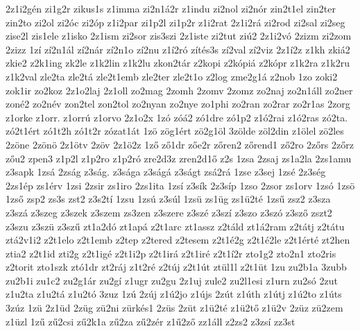 {2z1i2gén
zi1g2r
zikus1s
z1imma
zi2n1á2r
z1indu
zi2nol
zi2nór
zin2t1el
zin2ter
zin2to
zi2ol
zi2óc
zi2óp
z1i2par
zi1p2l
zi1p2r
z1i2rat
2z1i2rá
zi2rod
zi2sal
zi2seg
zise2l
zis1ele
z1isko
2z1ism
zi2sor
zis3szi
2z1iste
zi2tut
ziú2
2z1i2vó
2zizm
zi2zom
2zizz
1zí
zí2n1ál
zí2nár
zí2n1o
zí2nu
z1í2ró
zítés3s
zí2val
zí2viz
2z1í2z
z1kh
zkiá2
zkie2
z2k1ing
zk2le
z1k2lin
z1k2lu
zkon2tár
z2kopi
z2kópiá
z2kópr
z1k2ra
z1k2ru
z1k2val
zle2ta
zle2tá
zle2t1emb
zle2ter
zle2t1o
z2log
zme2g1á
z2nob
1zo
zoki2
zok1ir
zo2koz
2z1o2laj
2z1oll
zo2mag
2zomh
2zomv
2zomz
zo2naj
zo2n1áll
zo2ner
zoné2
zo2név
zon2tel
zon2tol
zo2nyan
zo2nye
zo1phi
zo2ran
zo2rar
zo2r1as
2zorg
z1orke
z1orr.
z1orrú
z1orvo
2z1o2x
1zó
zóá2
zó1dre
zó1p2
z1ó2rai
z1ó2ras
zó2ta.
zó2t1ért
zó1t2h
zó1t2r
zózat1át
1zö
zög1ért
zö2g1öl
3zölde
zöl2din
z1ölel
zö2les
2zöne
2zönö
2z1ötv
2zöv
2z1ö2z
1ző
ző1dr
zőe2r
zőren2
zőrend1
ző2ro
2zőrs
2zőrz
zőu2
zpen3
z1p2l
z1p2ro
z1p2ró
zre2d3z
zren2d1ő
z2s
1zsa
2zsaj
zs1a2la
2zs1amu
z3sapk
1zsá
2zság
z3ság.
z3sága
z3ságá
z3ságt
zsá2rá
1zse
z3sej
1zsé
2z3ség
2zs1ép
zs1érv
1zsi
2zsir
zs1iro
2zs1ita
1zsí
z3sík
2z3síp
1zso
2zsor
zs1orv
1zsó
1zsö
1zső
zsp2
zs3s
zst2
z3s2tí
1zsu
1zsú
z3súl
1zsü
zs1üg
zs1ü2té
1zsű
zsz2
z3sza
z3szá
z3szeg
z3szek
z3szem
zs3zen
z3szere
z3szé
z3szí
z3szo
z3szó
z3sző
zszt2
z3szu
z3szü
z3szű
zt1a2dó
zt1apá
z2t1arc
zt1assz
z2táld
zt1á2ram
z2tátj
z2tátu
ztá2v1i2
z2t1elo
z2t1emb
z2tep
z2tered
z2tesem
z2t1é2g
z2t1é2le
z2t1érté
zt2hen
ztia2
z2t1id
zti2g
z2t1igé
z2t1i2p
z2t1irá
z2t1iré
z2t1í2r
zto1g2
zto2n1
zto2ris
z2torit
zto1szk
ztó1dr
zt2ráj
z1t2ré
z2túj
z2t1út
ztül1l
z2t1üt
1zu
zu2b1a
3zubb
zu2b1i
zu1c2
zu2g1ár
zu2gí
z1ugr
zu2gu
2z1uj
zule2
zu2l1esi
z1urn
zu2só
2zut
z1u2ta
z1u2tá
z1u2tó
3zuz
1zú
2zúj
z1ú2jo
z1újs
2zút
z1úth
z1útj
z1ú2to
z1úts
3zúz
1zü
2z1üd
2züg
zü2ni
zürkés1
2züs
2züt
z1ü2té
z1ü2tő
z1ü2v
2züz
zü2zem
z1üzl
1zű
zű2csi
zű2k1a
zű2za
zű2zér
z1ű2ző
zz1áll
z2zs2
z3zsí
zz3st
}